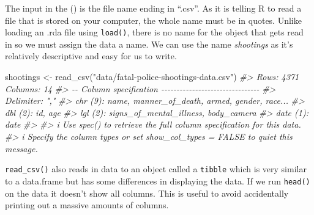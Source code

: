 \documentclass[
]{krantz}
\makeatletter
\newenvironment{Shaded}{\begin{snugshade}}{\end{snugshade}}
\newcommand{\CommentTok}[1]{\textcolor[rgb]{0.37,0.37,0.37}{\textit{#1}}}
\newcommand{\FunctionTok}[1]{\textcolor[rgb]{0,0,0}{#1}}
\newcommand{\NormalTok}[1]{#1}
\newcommand{\OtherTok}[1]{\textcolor[rgb]{0.37,0.37,0.37}{#1}}
\newcommand{\StringTok}[1]{\textcolor[rgb]{0.5,0.5,0.5}{#1}}
\newenvironment{kframe}{%
\medskip{}
\setlength{\fboxsep}{.8em}
 \def\at@end@of@kframe{}%
 \ifinner\ifhmode%
  \def\at@end@of@kframe{\end{minipage}}%
  \begin{minipage}{\columnwidth}%
 \fi\fi%
 \def\FrameCommand##1{\hskip\@totalleftmargin \hskip-\fboxsep
 \colorbox{shadecolor}{##1}\hskip-\fboxsep
     \hskip-\linewidth \hskip-\@totalleftmargin \hskip\columnwidth}%
 \MakeFramed {\advance\hsize-\width
   \@totalleftmargin\z@ \linewidth\hsize
   \@setminipage}}%
 {\par\unskip\endMakeFramed%
 \at@end@of@kframe}
\renewenvironment{Shaded}{\begin{kframe}}{\end{kframe}}
\makeatother
\begin{document}
The input in the () is the file name ending in ``.csv''. As it is telling R to read a file that is stored on your computer, the whole name must be in quotes. Unlike loading an .rda file using \texttt{load()}, there is no name for the object that gets read in so we must assign the data a name. We can use the name \emph{shootings} as it's relatively descriptive and easy for us to write.

\begin{Shaded}
\begin{Highlighting}[]
\NormalTok{shootings }\OtherTok{\textless{}{-}} \FunctionTok{read\_csv}\NormalTok{(}\StringTok{"data/fatal{-}police{-}shootings{-}data.csv"}\NormalTok{)}
\CommentTok{\#\textgreater{} Rows: 4371 Columns: 14}
\CommentTok{\#\textgreater{} {-}{-} Column specification {-}{-}{-}{-}{-}{-}{-}{-}{-}{-}{-}{-}{-}{-}{-}{-}{-}{-}{-}{-}{-}{-}{-}{-}{-}{-}{-}{-}{-}{-}{-}{-}}
\CommentTok{\#\textgreater{} Delimiter: ","}
\CommentTok{\#\textgreater{} chr  (9): name, manner\_of\_death, armed, gender, race...}
\CommentTok{\#\textgreater{} dbl  (2): id, age}
\CommentTok{\#\textgreater{} lgl  (2): signs\_of\_mental\_illness, body\_camera}
\CommentTok{\#\textgreater{} date (1): date}
\CommentTok{\#\textgreater{} }
\CommentTok{\#\textgreater{} i Use \textasciigrave{}spec()\textasciigrave{} to retrieve the full column specification for this data.}
\CommentTok{\#\textgreater{} i Specify the column types or set \textasciigrave{}show\_col\_types = FALSE\textasciigrave{} to quiet this message.}
\end{Highlighting}
\end{Shaded}

\texttt{read\_csv()} also reads in data to an object called a \texttt{tibble} which is very similar to a data.frame but has some differences in displaying the data. If we run \texttt{head()} on the data it doesn't show all columns. This is useful to avoid accidentally printing out a massive amounts of columns.
\end{document}
